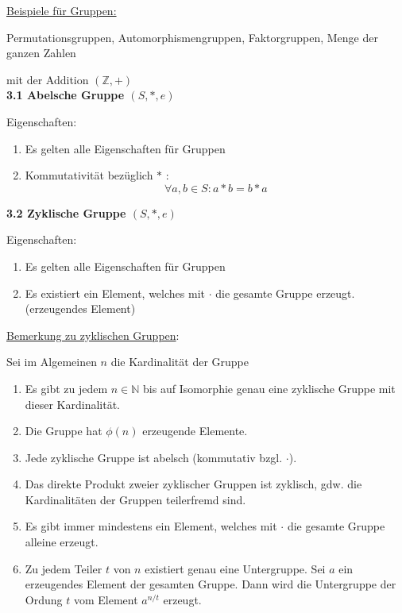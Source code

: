 \documentclass[18pt] {article}
\begin{document}
\underline{Beispiele für Gruppen:}

Permutationsgruppen, Automorphismengruppen, Faktorgruppen, Menge der ganzen Zahlen 

mit der Addition $(\mathbb{Z}, +)$\\

\textbf{3.1 Abelsche Gruppe $(S, *, e)$}
\begin{framed}
Eigenschaften: \\
\begin{enumerate}
\item Es gelten alle Eigenschaften für Gruppen

\item Kommutativität bezüglich $*$ :\\
$$ \forall a, b \in S: a * b = b * a$$
\end{enumerate}
\end{framed} 
\pagebreak
\textbf{3.2 Zyklische Gruppe $(S, *, e)$}
\begin{framed}
Eigenschaften: \\

\begin{enumerate}
\item Es gelten alle Eigenschaften für Gruppen

\item Es existiert ein Element, welches mit $\cdot$ die gesamte Gruppe erzeugt. (erzeugendes Element)
\end{enumerate}
\end{framed} 

\underline{Bemerkung zu zyklischen Gruppen}: 

Sei im Algemeinen $n$ die Kardinalität der Gruppe
\begin{enumerate}
\item Es gibt zu jedem $n \in \mathbb{N}$ bis auf Isomorphie genau eine zyklische Gruppe mit dieser Kardinalität.
\item Die Gruppe hat $\phi (n)$ erzeugende Elemente.
\item Jede zyklische Gruppe ist abelsch (kommutativ bzgl. $\cdot$).
\item Das direkte Produkt zweier zyklischer Gruppen ist zyklisch, gdw. die Kardinalitäten der Gruppen teilerfremd sind.

\item Es gibt immer mindestens ein Element, welches mit $\cdot$ die gesamte Gruppe alleine erzeugt.

\item Zu jedem Teiler $t$ von $n$ existiert genau eine Untergruppe. Sei $a$ ein erzeugendes Element der gesamten Gruppe. Dann wird die Untergruppe der Ordung $t$ vom Element $a^{n/t}$ erzeugt.

\end{enumerate}
\end{document}
